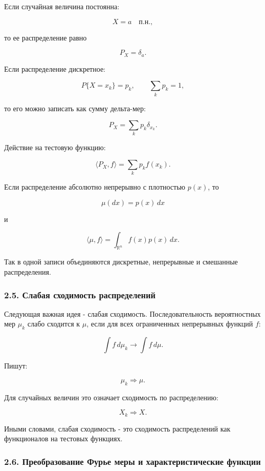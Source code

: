 \documentclass[
  11pt,
  a4paper,
]{article}
\begin{document}
Если случайная величина постоянна:

\[
X=a
\quad\text{п.н.},
\]

то ее распределение равно

\[
P_X=\delta_a.
\]

Если распределение дискретное:

\[
P\{X=x_k\}=p_k,
\qquad
\sum_k p_k=1,
\]

то его можно записать как сумму дельта-мер:

\[
P_X=\sum_k p_k\delta_{x_k}.
\]

Действие на тестовую функцию:

\[
\langle P_X,f\rangle
=
\sum_k p_k f(x_k).
\]

Если распределение абсолютно непрерывно с плотностью \(p(x)\), то

\[
\mu(dx)=p(x)\,dx
\]

и

\[
\langle\mu,f\rangle
=
\int_{\mathbb R^n}f(x)p(x)\,dx.
\]

Так в одной записи объединяются дискретные, непрерывные и смешанные
распределения.

\subsubsection{2.5. Слабая сходимость
распределений}\label{ux441ux43bux430ux431ux430ux44f-ux441ux445ux43eux434ux438ux43cux43eux441ux442ux44c-ux440ux430ux441ux43fux440ux435ux434ux435ux43bux435ux43dux438ux439}

Следующая важная идея - слабая сходимость. Последовательность
вероятностных мер \(\mu_k\) слабо сходится к \(\mu\), если для всех
ограниченных непрерывных функций \(f\):

\[
\int f\,d\mu_k\to\int f\,d\mu.
\]

Пишут:

\[
\mu_k\Rightarrow\mu.
\]

Для случайных величин это означает сходимость по распределению:

\[
X_k\Rightarrow X.
\]

Иными словами, слабая сходимость - это сходимость распределений как
функционалов на тестовых функциях.

\subsubsection{2.6. Преобразование Фурье меры и характеристические
функции}\label{ux43fux440ux435ux43eux431ux440ux430ux437ux43eux432ux430ux43dux438ux435-ux444ux443ux440ux44cux435-ux43cux435ux440ux44b-ux438-ux445ux430ux440ux430ux43aux442ux435ux440ux438ux441ux442ux438ux447ux435ux441ux43aux438ux435-ux444ux443ux43dux43aux446ux438ux438}
\end{document}
